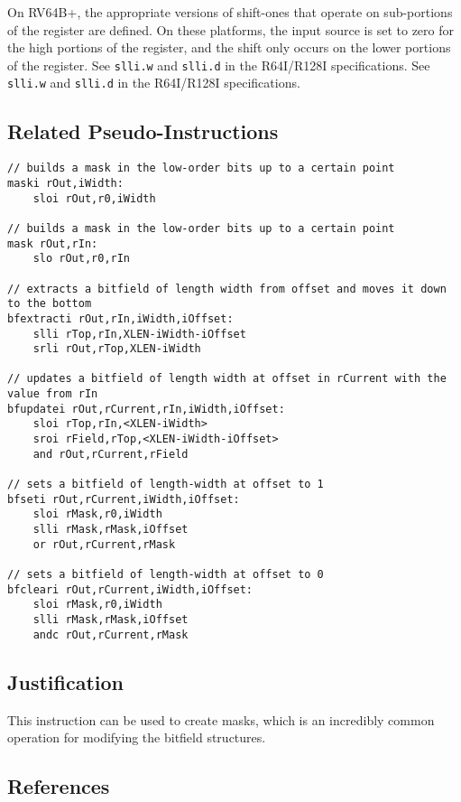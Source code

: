 On RV64B+, the appropriate versions of shift-ones that operate on
sub-portions of the register are defined. On these platforms, the input
source is set to zero for the high portions of the register, and the
shift only occurs on the lower portions of the register. See
\texttt{slli.w} and \texttt{slli.d} in the R64I/R128I specifications.
See \texttt{slli.w} and \texttt{slli.d} in the R64I/R128I
specifications.

\subsection{Related Pseudo-Instructions}

\begin{verbatim}
// builds a mask in the low-order bits up to a certain point
maski rOut,iWidth:
    sloi rOut,r0,iWidth

// builds a mask in the low-order bits up to a certain point
mask rOut,rIn:
    slo rOut,r0,rIn

// extracts a bitfield of length width from offset and moves it down to the bottom
bfextracti rOut,rIn,iWidth,iOffset:
    slli rTop,rIn,XLEN-iWidth-iOffset
    srli rOut,rTop,XLEN-iWidth

// updates a bitfield of length width at offset in rCurrent with the value from rIn
bfupdatei rOut,rCurrent,rIn,iWidth,iOffset:
    sloi rTop,rIn,<XLEN-iWidth>
    sroi rField,rTop,<XLEN-iWidth-iOffset>
    and rOut,rCurrent,rField

// sets a bitfield of length-width at offset to 1
bfseti rOut,rCurrent,iWidth,iOffset:
    sloi rMask,r0,iWidth
    slli rMask,rMask,iOffset
    or rOut,rCurrent,rMask

// sets a bitfield of length-width at offset to 0
bfcleari rOut,rCurrent,iWidth,iOffset:
    sloi rMask,r0,iWidth
    slli rMask,rMask,iOffset
    andc rOut,rCurrent,rMask
\end{verbatim}

\subsection{Justification}

This instruction can be used to create masks, which is an incredibly
common operation for modifying the bitfield structures.

\subsection{References}


